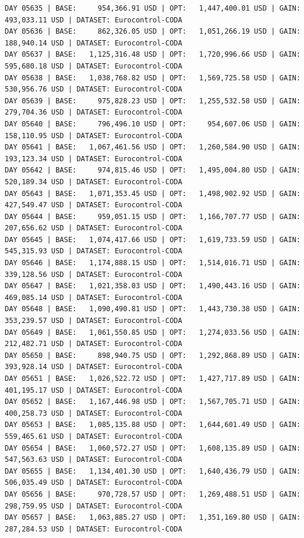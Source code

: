 \documentclass[11pt,a4paper]{article}
\begin{document}
\begin{verbatim}
DAY 05635 | BASE:     954,366.91 USD | OPT:   1,447,400.01 USD | GAIN: 493,033.11 USD | DATASET: Eurocontrol-CODA
DAY 05636 | BASE:     862,326.05 USD | OPT:   1,051,266.19 USD | GAIN: 188,940.14 USD | DATASET: Eurocontrol-CODA
DAY 05637 | BASE:   1,125,316.48 USD | OPT:   1,720,996.66 USD | GAIN: 595,680.18 USD | DATASET: Eurocontrol-CODA
DAY 05638 | BASE:   1,038,768.82 USD | OPT:   1,569,725.58 USD | GAIN: 530,956.76 USD | DATASET: Eurocontrol-CODA
DAY 05639 | BASE:     975,828.23 USD | OPT:   1,255,532.58 USD | GAIN: 279,704.36 USD | DATASET: Eurocontrol-CODA
DAY 05640 | BASE:     796,496.10 USD | OPT:     954,607.06 USD | GAIN: 158,110.95 USD | DATASET: Eurocontrol-CODA
DAY 05641 | BASE:   1,067,461.56 USD | OPT:   1,260,584.90 USD | GAIN: 193,123.34 USD | DATASET: Eurocontrol-CODA
DAY 05642 | BASE:     974,815.46 USD | OPT:   1,495,004.80 USD | GAIN: 520,189.34 USD | DATASET: Eurocontrol-CODA
DAY 05643 | BASE:   1,071,353.45 USD | OPT:   1,498,902.92 USD | GAIN: 427,549.47 USD | DATASET: Eurocontrol-CODA
DAY 05644 | BASE:     959,051.15 USD | OPT:   1,166,707.77 USD | GAIN: 207,656.62 USD | DATASET: Eurocontrol-CODA
DAY 05645 | BASE:   1,074,417.66 USD | OPT:   1,619,733.59 USD | GAIN: 545,315.93 USD | DATASET: Eurocontrol-CODA
DAY 05646 | BASE:   1,174,888.15 USD | OPT:   1,514,016.71 USD | GAIN: 339,128.56 USD | DATASET: Eurocontrol-CODA
DAY 05647 | BASE:   1,021,358.03 USD | OPT:   1,490,443.16 USD | GAIN: 469,085.14 USD | DATASET: Eurocontrol-CODA
DAY 05648 | BASE:   1,090,490.81 USD | OPT:   1,443,730.38 USD | GAIN: 353,239.57 USD | DATASET: Eurocontrol-CODA
DAY 05649 | BASE:   1,061,550.85 USD | OPT:   1,274,033.56 USD | GAIN: 212,482.71 USD | DATASET: Eurocontrol-CODA
DAY 05650 | BASE:     898,940.75 USD | OPT:   1,292,868.89 USD | GAIN: 393,928.14 USD | DATASET: Eurocontrol-CODA
DAY 05651 | BASE:   1,026,522.72 USD | OPT:   1,427,717.89 USD | GAIN: 401,195.17 USD | DATASET: Eurocontrol-CODA
DAY 05652 | BASE:   1,167,446.98 USD | OPT:   1,567,705.71 USD | GAIN: 400,258.73 USD | DATASET: Eurocontrol-CODA
DAY 05653 | BASE:   1,085,135.88 USD | OPT:   1,644,601.49 USD | GAIN: 559,465.61 USD | DATASET: Eurocontrol-CODA
DAY 05654 | BASE:   1,060,572.27 USD | OPT:   1,608,135.89 USD | GAIN: 547,563.63 USD | DATASET: Eurocontrol-CODA
DAY 05655 | BASE:   1,134,401.30 USD | OPT:   1,640,436.79 USD | GAIN: 506,035.49 USD | DATASET: Eurocontrol-CODA
DAY 05656 | BASE:     970,728.57 USD | OPT:   1,269,488.51 USD | GAIN: 298,759.95 USD | DATASET: Eurocontrol-CODA
DAY 05657 | BASE:   1,063,885.27 USD | OPT:   1,351,169.80 USD | GAIN: 287,284.53 USD | DATASET: Eurocontrol-CODA

\end{verbatim}
\end{document}
